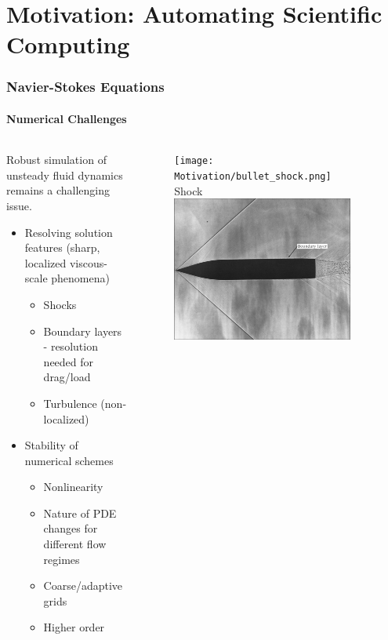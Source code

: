 \documentclass[18pt,xcolor=table]{beamer}
\begin{document}
\section{Motivation: Automating Scientific Computing}
\begin{frame}[t]
\frametitle{Navier-Stokes Equations}
\framesubtitle{Numerical Challenges}
\begin{columns}[c]
\begin{column}{.6\textwidth}
Robust simulation of unsteady fluid dynamics remains a challenging issue.
\vspace{2ex}

\begin{itemize}
\item{} Resolving solution features (sharp, localized viscous-scale phenomena)
\begin{itemize}
\item{} Shocks
\item{} Boundary layers - resolution needed for drag/load
\item{} Turbulence (non-localized)
\end{itemize}
\item{} Stability of numerical schemes
\begin{itemize}
\item{} Nonlinearity
\item{} Nature of PDE changes for different flow regimes
\item{} Coarse/adaptive grids
\item{} Higher order
\end{itemize}
\end{itemize}
\end{column}
\begin{column}{.4\textwidth}
\vspace{-3ex}
\begin{figure}
\centering
\texttt{[image: Motivation/bullet\_shock.png]}\\
Shock\\\vspace{1ex}
\includegraphics[width=0.9\textwidth]{Motivation/boundary_layer.png}\\

\end{figure}
\end{column}
\end{columns}
\end{frame}
\end{document}

